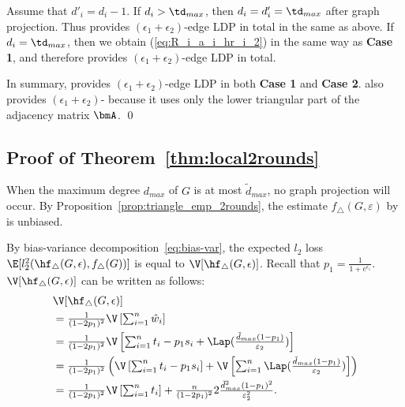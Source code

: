 Assume that $d'_i = d_i - 1$. 
If $d_i > \td_{max}$, then $d_i = d'_i = \td_{max}$ after graph projection. 
Thus  provides $(\epsilon_1 + \epsilon_2)$-edge LDP in total in the same as above. 
If $d_i = \td_{max}$, then we obtain (\ref{eq:R_i_a_i_hr_i_2}) in the same way as \textbf{Case 1}, and therefore  provides $(\epsilon_1 + \epsilon_2)$-edge LDP in total.

\smallskip
In summary,  provides $(\epsilon_1 + \epsilon_2)$-edge LDP in both \textbf{Case 1} and \textbf{Case 2}. 
 also provides $(\epsilon_1 + \epsilon_2)$- 
because it uses only the lower triangular part of the adjacency matrix $\bmA$. \qed

\subsection{Proof of Theorem~\ref{thm:local2rounds}}
  When the maximum degree $d_{max}$ of $G$ is at most $\tilde{d}_{max}$, no graph
  projection will occur.
  By Proposition~\ref{prop:triangle_emp_2rounds}, the estimate
  $f_\triangle(G,\varepsilon)$ by  is unbiased.

  By bias-variance
  decomposition~\eqref{eq:bias-var}, the expected $l_2$ loss
  $\E[l_2^2(\hf_\triangle(G, \epsilon), f_\triangle(G))]$ is equal to
  $\V[\hf_\triangle(G,\epsilon)]$.
  Recall that $p_1 = \frac{1}{1+e^{\epsilon_1}}$.
  $\V[\hf_\triangle(G,\epsilon)]$ 
  can be written as follows:
  \begin{align}
    &\V[\hf_\triangle(G,\epsilon)] \\
    &= \textstyle{\frac{1}{(1-2p_1)^2}\V\left[\sum_{i=1}^n
    \hat{w}_i\right]} \nonumber \\
    &= \textstyle{\frac{1}{(1-2p_1)^2}\V\left[\sum_{i=1}^n
    t_i - p_1 s_i +
    \Lap(\frac{\tilde{d}_{max}(1-p_1)}{\varepsilon_2})\right]} \nonumber \\
    &= \textstyle{\frac{1}{(1-2p_1)^2}\left(\V\left[\sum_{i=1}^n
    t_i - p_1 s_i \right] +
    \V\left[\sum_{i=1}^n
    \Lap(\frac{\tilde{d}_{max}(1-p_1)}{\varepsilon_2})\right]\right)} \nonumber \\
    &= \textstyle{\frac{1}{(1-2p_1)^2}\V\left[\sum_{i=1}^n
    t_i \right] + \frac{n}{(1-2p_1)^2}
    2\frac{\tilde{d}_{max}^2(1-p_1)^2}{\varepsilon_2^2}}.\label{eq:local2rounds-var}
  \end{align}

